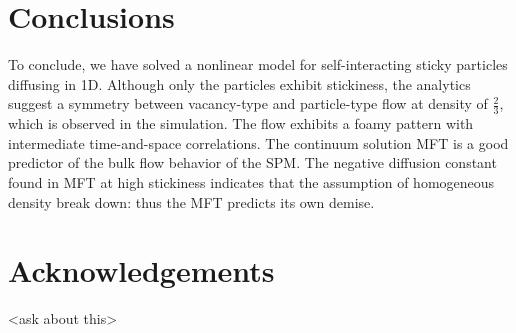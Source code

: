 \section{Conclusions}
To conclude, we have solved a nonlinear model for self-interacting sticky particles diffusing in 1D.  Although only the particles exhibit stickiness,  the analytics suggest a symmetry between vacancy-type and particle-type flow
at density of $\frac{2}{3}$, which is observed in the simulation.  The flow exhibits a foamy pattern with intermediate time-and-space correlations.  The continuum solution MFT is a good predictor of the bulk flow behavior of the SPM.
The negative diffusion constant found in MFT at high stickiness indicates  that the assumption of homogeneous density break down: thus the MFT predicts its own demise.

\section{Acknowledgements}
<ask about this>
